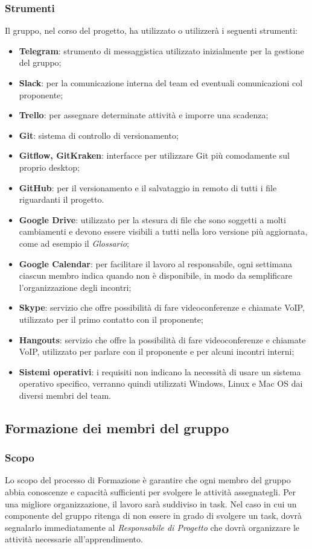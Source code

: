 		\subsubsection{Strumenti}
		Il gruppo, nel corso del progetto, ha utilizzato o utilizzerà i seguenti strumenti:
		\begin{itemize}
			\item \textbf{Telegram\glo}: strumento di messaggistica utilizzato inizialmente per la gestione del gruppo;
			\item \textbf{Slack\glo}: per la comunicazione interna del team ed eventuali comunicazioni col proponente;
			\item \textbf{Trello}: per assegnare determinate attività e imporre una scadenza;
			\item \textbf{Git}: sistema di controllo di versionamento;
			\item \textbf{Gitflow, GitKraken}: interfacce per utilizzare Git più comodamente sul proprio desktop;
			\item \textbf{GitHub}: per il versionamento e il salvataggio in remoto di tutti i file riguardanti il progetto.
			\item \textbf{Google Drive}: utilizzato per la stesura di file che sono soggetti a molti cambiamenti e devono essere visibili a tutti nella loro versione più aggiornata, come ad esempio il \textit{Glossario};
			\item \textbf{Google Calendar}: per facilitare il lavoro al responsabile, ogni settimana ciascun membro indica quando non è disponibile, in modo da semplificare l'organizzazione degli incontri;
			\item \textbf{Skype}: servizio che offre possibilità di fare videoconferenze e chiamate VoIP, utilizzato per il primo contatto con il proponente;
			\item \textbf{Hangouts}: servizio che offre la possibilità di fare videoconferenze e chiamate VoIP, utilizzato per parlare con il proponente e per alcuni incontri interni;
			\item \textbf{Sistemi operativi}: i requisiti non indicano la necessità di usare un sistema operativo specifico, verranno quindi utilizzati Windows, Linux e Mac OS dai diversi membri del team. %
		\end{itemize}
	\subsection{Formazione dei membri del gruppo}
	\subsubsection{Scopo}
	Lo scopo del processo di Formazione è garantire che ogni membro del gruppo 
	abbia conoscenze e capacità sufficienti per svolgere le attività 
	assegnategli. Per una migliore organizzazione, il lavoro sarà suddiviso in 
	task. Nel caso in cui un componente del gruppo ritenga di non essere in 
	grado di svolgere un task, dovrà segnalarlo immediatamente al 
	\textit{Responsabile di Progetto} che dovrà organizzare le attività 
	necessarie all'apprendimento.
